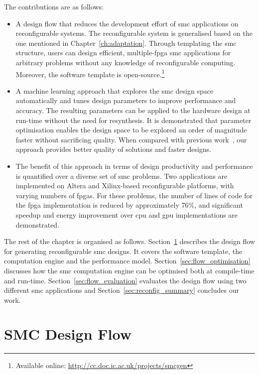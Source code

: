 The contributions are as follows:
\begin{itemize}
\item A design flow that reduces the development effort of \gls{smc} applications on reconfigurable systems.
The reconfigurable system is generalised based on the one mentioned in Chapter~\ref{ch:adaptation}.
Through templating the \gls{smc} structure, users can design efficient, multiple-\gls{fpga} \gls{smc} applications for arbitrary problems without any knowledge of reconfigurable computing.
Moreover, the software template is open-source.\footnote{Available online: \url{http://cc.doc.ic.ac.uk/projects/smcgen}}
\item A machine learning approach that explores the \gls{smc} design space automatically and tunes design parameters to improve performance and accuracy. The resulting parameters can be applied to the hardware design at run-time without the need for resynthesis.
It is demonstrated that parameter optimisation enables the design space to be explored an order of magnitude faster without sacrificing quality.
When compared with previous work~\cite{chau14trets,chau13acm},
our approach provides better quality of solutions and faster designs.
\item The benefit of this approach in terms of design productivity and performance is quantified over a diverse set of \gls{smc} problems.
Two applications are implemented on Altera and Xilinx-based reconfigurable platforms, with varying numbers of \glspl{fpga}. For these problems, the number of lines of code for the \gls{fpga} implementation is reduced by approximately 76\%, and 
significant speedup and energy improvement over \gls{cpu} and \gls{gpu} implementations are demonstrated.
\end{itemize}

The rest of the chapter is organised as follows.
Section~\ref{sec:flow_design} describes the design flow for generating reconfigurable \gls{smc} designs.
It covers the software template, the computation engine and the performance model.
Section~\ref{sec:flow_optimisation} discusses how the \gls{smc} computation engine can be optimised both at compile-time and run-time.
Section~\ref{sec:flow_evaluation} evaluates the design flow using two different \gls{smc} applications and 
Section~\ref{sec:reconfig_summary} concludes our work.


\section{SMC Design Flow}
\label{sec:flow_design}

